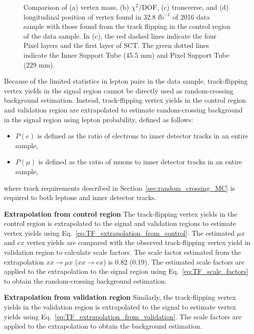 \begin{figure}[!htb]
    \caption{Comparison of (a) vertex mass, (b) $\chi^{2} / \mathrm{DOF}$, (c) transverse, and (d) longitudinal position of vertex found in 32.8 $\mathrm{fb^{-1}}$ of 2016 data sample with those found from the track flipping in the control region of the data sample. In (c), the red dashed lines indicate the four Pixel layers and the first layer of SCT. The green dotted lines indicate the Inner Support Tube (45.5 mm) and Pixel Support Tube (229 mm).}
    \label{fig:random-crossing_vertex_dist_data}
\end{figure}

 Because of the limited statistics in lepton pairs in the data sample, track-flipping vertex yields in the signal region cannot be directly used as random-crossing background estimation. Instead, track-flipping vertex yields in the control region and validation region are extrapolated to estimate random-crossing background in the signal region using lepton probability, defined as follows:
\begin{itemize}
\item $P(e)$ is defined as the ratio of electrons to inner detector tracks in an entire sample,
\item $P(\mu)$ is defined as the ratio of muons to inner detector tracks in an entire sample,
\end{itemize}
where track requirements described in Section~\ref{sec:random_crossing_MC} is required to both leptons and inner detector tracks.

\textbf{Extrapolation from control region} The track-flipping vertex yields in the control region is extrapolated to the signal and validation regions to estimate vertex yields using Eq.~\ref{eq:TF_extrapolation_from_control}. The estimated $\mu x$ and $ex$ vertex yields are compared with the observed track-flipping vertex yield in validation region to calculate scale factors. The scale factor estimated from the extrapolation $xx\rightarrow \mu x$ ($xx\rightarrow ex$) is 0.82 (0.19). The estimated scale factors are applied to the extrapolation to the signal region using Eq.~\ref{eq:TF_scale_factors} to obtain the random-crossing background estimation.

\textbf{Extrapolation from validation region} Similarly, the track-flipping vertex yields in the validation region is extrapolated to the signal to estimate vertex yields using Eq.~\ref{eq:TF_extrapolation_from_validation}. The scale factors are applied to the extrapolation to obtain the background estimation.

